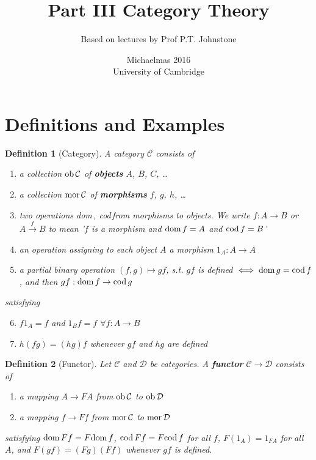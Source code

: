 \documentclass[a4paper]{article}
\title{Part III Category Theory}
\author{Based on lectures by Prof P.T. Johnstone}
\date{Michaelmas 2016\\University of Cambridge}
\newtheorem{definition}{Definition}
\numberwithin{definition}{section}
\newcommand*\dom[1]{\textnormal{dom}\,#1}
\newcommand*\cod[1]{\textnormal{cod}\,#1}
\newcommand*\ob[1]{\textnormal{ob}\,#1}
\newcommand*\mor[1]{\textnormal{mor}\,#1}
\begin{document}
\maketitle
\tableofcontents

\section{Definitions and Examples}
\begin{definition}[Category]
	A category $\mathcal{C}$ consists of 
	\begin{enumerate}[label=\alph*.]
		\item a collection $\ob{\mathcal{C}}$ of \textbf{objects} $A$, $B$, $C$, \dots
		\item a collection $\mor{\mathcal{C}}$ of \textbf{morphisms} $f$, $g$, $h$, \dots
		\item two operations \dom, \cod from morphisms to objects. We write $f:A\to B$ or $A\overset{f}{\to}B$ to mean '$f$ is a morphism and $\dom{f}=A$ and $\cod{f}=B$'
		\item an operation assigning to each object $A$ a morphism $1_A:A\to A$
		\item a partial binary operation $(f, g) \mapsto gf$, s.t. $gf$ is defined $\iff \dom{g}=\cod{f}$, and then $gf:\dom{f}\to\cod{g}$
	\end{enumerate}
	satisfying
	\begin{enumerate}[label=\alph*.]
		\setcounter{enumi}{5}
		\item $f 1_A = f$ and $1_B f=f$ $\forall f: A \to B$
		\item $h(fg) = (hg)f$ whenever $gf$ and $hg$ are defined
	\end{enumerate}
\end{definition}

\begin{definition}[Functor]
	Let $\mathcal{C}$ and $\mathcal{D}$ be categories. A \textbf{functor} $\mathcal{C}\to\mathcal{D}$ consists of
	\begin{enumerate}[label=\alph*.]
		\item a mapping $A \to FA$ from $\ob{\mathcal{C}}$ to $\ob{\mathcal{D}}$
		\item a mapping $f \to Ff$ from $\mor{\mathcal{C}}$ to $\mor{\mathcal{D}}$
	\end{enumerate}
	satisfying $\dom{Ff}=F\dom{f}$, $\cod{Ff}=F\cod{f}$ for all $f$, $F(1_A)=1_{FA}$ for all $A$, and $F(gf)=(Fg)(Ff)$ whenever $gf$ is defined.
\end{definition}
\end{document}
